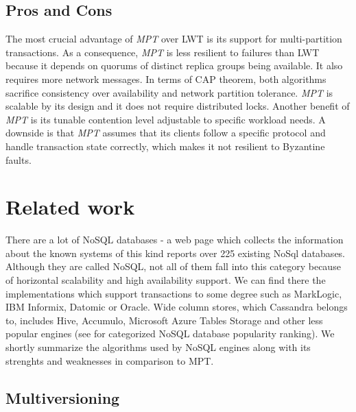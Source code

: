 \documentclass[runningheads,a4paper]{llncs}
\newcommand{\mpt}{\emph{MPT}\xspace}
\begin{document}

\subsection{Pros and Cons}
The most crucial advantage of \mpt over LWT is its support for multi-partition transactions. As a consequence, \mpt is less resilient to failures than LWT because it depends on quorums of distinct replica groups being available. It also requires more network messages. In terms of CAP theorem, both algorithms sacrifice consistency over availability and network partition tolerance. \mpt is scalable by its design and it does not require distributed locks. Another benefit of \mpt is its tunable contention level adjustable to specific workload needs. A downside is that \mpt assumes that its clients follow a specific protocol and handle transaction state correctly, which makes it not resilient to Byzantine faults. 


\section{Related work}

There are a lot of NoSQL databases - a web page which collects the information about the known systems of this kind \cite{NoSqlDatabasesOrg} reports over 225 existing NoSql databases. Although they are called NoSQL, not all of them fall into this category because of horizontal scalability and high availability support. We can find there the implementations which support transactions to some degree such as MarkLogic, IBM Informix, Datomic or Oracle. Wide column stores, which Cassandra belongs to, includes Hive, Accumulo, Microsoft Azure Tables Storage and other less popular engines (see \cite{DbEngines} for categorized NoSQL database popularity ranking). We shortly summarize the algorithms used by NoSQL engines along with its strenghts and weaknesses in comparison to MPT.

\subsection{Multiversioning} 
\end{document}
